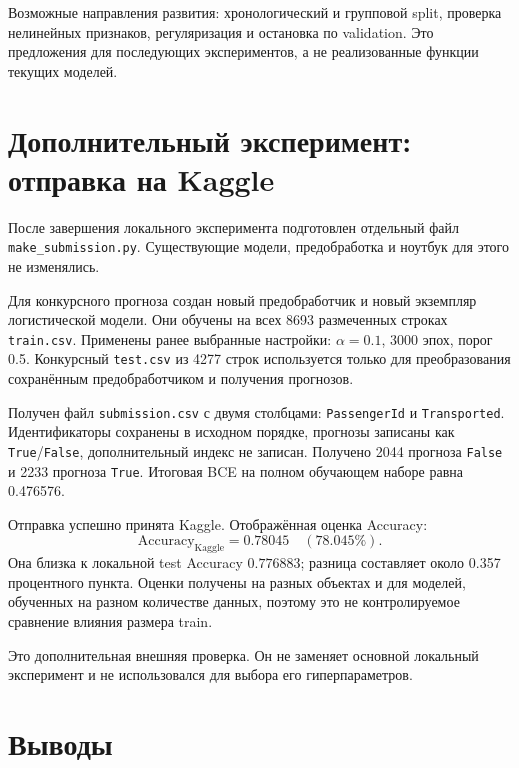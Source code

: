\documentclass[a4paper,12pt]{article}
\newcommand{\code}[1]{\texttt{#1}}
\begin{document}
Возможные направления развития: хронологический и групповой split,
проверка нелинейных признаков, регуляризация и остановка по validation.
Это предложения для последующих экспериментов, а не реализованные
функции текущих моделей.

\section{Дополнительный эксперимент: отправка на Kaggle}
\label{sec:kaggle}

После завершения локального эксперимента подготовлен отдельный файл
\code{make\_submission.py}. Существующие модели, предобработка и ноутбук
для этого не изменялись.

Для конкурсного прогноза создан новый предобработчик и новый экземпляр
логистической модели. Они обучены на всех 8693 размеченных строках
\code{train.csv}. Применены ранее выбранные настройки:
$\alpha=0.1$, 3000 эпох, порог 0.5.
Конкурсный \code{test.csv} из 4277 строк используется только
для преобразования сохранённым предобработчиком и получения прогнозов.

Получен файл \code{submission.csv} с двумя столбцами:
\code{PassengerId} и \code{Transported}. Идентификаторы сохранены
в исходном порядке, прогнозы записаны как \code{True}/\code{False},
дополнительный индекс не записан.
Получено 2044 прогноза \code{False} и 2233 прогноза \code{True}.
Итоговая BCE на полном обучающем наборе равна 0.476576.

Отправка успешно принята Kaggle. Отображённая оценка Accuracy:
\begin{equation}
    \mathrm{Accuracy}_{\mathrm{Kaggle}}=0.78045
    \quad (78.045\%).
\end{equation}
Она близка к локальной test Accuracy $0.776883$;
разница составляет около 0.357 процентного пункта.
Оценки получены на разных объектах и для моделей, обученных
на разном количестве данных, поэтому это не контролируемое сравнение
влияния размера train.

Это дополнительная внешняя проверка.
Он не заменяет основной локальный эксперимент и не использовался
для выбора его гиперпараметров.

\section{Выводы}
\end{document}
